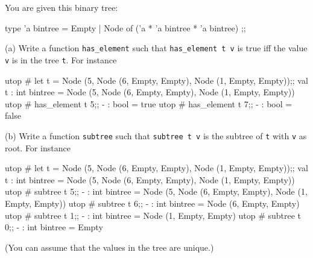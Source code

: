 \newpage
\nextq
You are given this binary tree:
\begin{console}
type 'a bintree = Empty
                | Node of ('a * 'a bintree * 'a bintree)
;;
\end{console}
(a) Write a function \verb!has_element! such that
\verb!has_element t v! is true iff the value \verb!v! is in the
tree \verb!t!.
For instance
\begin{console}
utop # let t = Node (5, Node (6, Empty, Empty), Node (1, Empty, Empty));;
val t : int bintree = Node (5, Node (6, Empty, Empty), Node (1, Empty, Empty))
utop # has_element t 5;;
- : bool = true
utop # has_element t 7;;
- : bool = false
\end{console}
\ANSWER
\begin{answercode}

\end{answercode}

(b)
Write a function \verb!subtree! such that 
\verb!subtree t v! is the subtree of \verb!t! with \verb!v! as root.
For instance
\begin{console}
utop # let t = Node (5, Node (6, Empty, Empty), Node (1, Empty, Empty));;
val t : int bintree = Node (5, Node (6, Empty, Empty), Node (1, Empty, Empty))
utop # subtree t 5;;
- : int bintree = Node (5, Node (6, Empty, Empty), Node (1, Empty, Empty))
utop # subtree t 6;;
- : int bintree = Node (6, Empty, Empty)
utop # subtree t 1;;
- : int bintree = Node (1, Empty, Empty)
utop # subtree t 0;;
- : int bintree = Empty
\end{console}
(You can assume that the values in the tree are unique.)
\\
\ANSWER
\begin{answercode}

\end{answercode}


%


